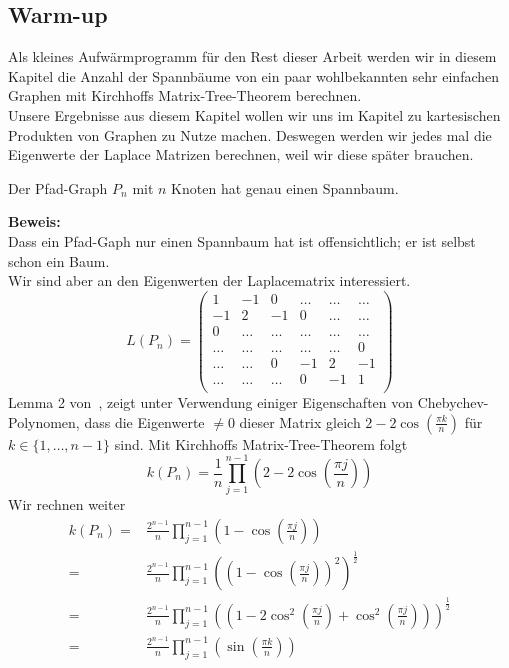 \subsection{Warm-up}
Als kleines Aufwärmprogramm für den Rest dieser Arbeit werden wir in diesem Kapitel die Anzahl der Spannbäume von ein paar wohlbekannten sehr einfachen Graphen mit Kirchhoffs Matrix-Tree-Theorem berechnen.\\
Unsere Ergebnisse aus diesem Kapitel wollen wir uns im Kapitel zu kartesischen Produkten von Graphen zu Nutze machen. Deswegen werden wir jedes mal die Eigenwerte der Laplace Matrizen berechnen, weil wir diese später brauchen.\\
\begin{Lms}
 Der Pfad-Graph $P_n$ mit $n$ Knoten hat genau einen Spannbaum.
\end{Lms}
\textbf{Beweis:}\\
Dass ein Pfad-Gaph nur einen Spannbaum hat ist offensichtlich; er ist selbst schon ein Baum.\\
Wir sind aber an den Eigenwerten der Laplacematrix interessiert.\\
\begin{equation}
L(P_n)=
\begin{pmatrix}
1&-1&0&\ldots&\ldots&\ldots\\
-1&2&-1&0&\ldots&\ldots\\
0&\ldots&\ldots&\ldots&\ldots&\ldots\\
\ldots&\ldots&\ldots&\ldots&\ldots&0\\
\ldots&\ldots&0&-1&2&-1\\
\ldots&\ldots&\ldots&0&-1&1\\
\end{pmatrix}
\end{equation}
Lemma 2 von~\cite{daoud_2014}, zeigt unter Verwendung einiger Eigenschaften von Chebychev-Polynomen, dass die Eigenwerte $\neq 0$ dieser Matrix gleich $2-2\cos \left(\frac{\pi k}{n}\right)$ für $k \in \{1,\ldots,n-1\}$ sind.
Mit Kirchhoffs Matrix-Tree-Theorem folgt
\begin{equation}
 \mathit{k}(P_n)=\frac{1}{n}\prod_{j=1}^{n-1} \left(2-2\cos \left(\frac{\pi j}{n}\right)\right)
\end{equation}
Wir rechnen weiter
\begin{equation}
\begin{split}
 \mathit{k}(P_n)={} & \frac{2^{n-1}}{n}\prod_{j=1}^{n-1} \left(1-\cos \left(\frac{\pi j}{n}\right)\right) \\
  ={}& \frac{2^{n-1}}{n}\prod_{j=1}^{n-1} \left(\left(1-\cos \left(\frac{\pi j}{n}\right)\right)^2\right)^{\frac{1}{2}} \\
  ={}&\frac{2^{n-1}}{n}\prod_{j=1}^{n-1} \left(\left(1-2\cos^2 \left(\frac{\pi j}{n}\right)+\cos^2 \left(\frac{\pi j}{n}\right)\right)\right)^{\frac{1}{2}} \\
  ={}& \frac{2^{n-1}}{n}\prod_{j=1}^{n-1} \left(\sin\left(\frac{\pi k}{n}\right) \right)
  \end{split}
\end{equation}
